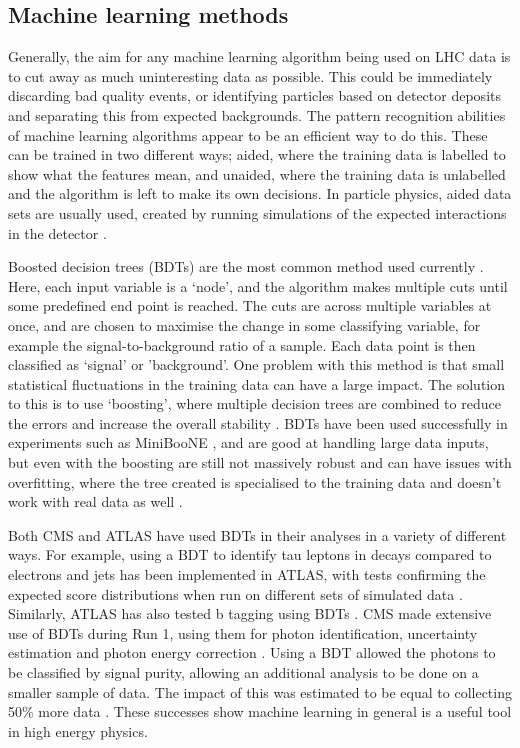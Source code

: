 \documentclass[12pt]{article}
\begin{document}
\subsection*{Machine learning methods}

Generally, the aim for any machine learning algorithm being used on LHC data is to cut away as much uninteresting data as possible. This could be immediately discarding bad quality events, or identifying particles based on detector deposits and separating this from expected backgrounds. The pattern recognition abilities of machine learning algorithms appear to be an efficient way to do this. These can be trained in two different ways; aided, where the training data is labelled to show what the features mean, and unaided, where the training data is unlabelled and the algorithm is left to make its own decisions. In particle physics, aided data sets are usually used, created by running simulations of the expected interactions in the detector \cite{mlreview}. 

Boosted decision trees (BDTs) are the most common method used currently \cite{ml7}. Here, each input variable is a `node', and the algorithm makes multiple cuts until some predefined end point is reached. The cuts are across multiple variables at once, and are chosen to maximise the change in some classifying variable, for example the signal-to-background ratio of a sample. Each data point is then classified as `signal' or 'background'. One problem with this method is that small statistical fluctuations in the training data can have a large impact. The solution to this is to use `boosting', where multiple decision trees are combined to reduce the errors and increase the overall stability \cite{ml8}. BDTs have been used successfully in experiments such as MiniBooNE \cite{ml2}, and are good at handling large data inputs, but even with the boosting are still not massively robust and can have issues with overfitting, where the tree created is specialised to the training data and doesn't work with real data as well \cite{ml1}. 

Both CMS and ATLAS have used BDTs in their analyses in a variety of different ways. For example, using a BDT to identify tau leptons in decays compared to electrons and jets has been implemented in ATLAS, with tests confirming the expected score distributions when run on different sets of simulated data \cite{ml4}. Similarly, ATLAS has also tested b tagging using BDTs \cite{ml5}. CMS made extensive use of BDTs during Run 1, using them for photon identification, uncertainty estimation and photon energy correction \cite{ml6}. Using a BDT allowed the photons to be classified by signal purity, allowing an additional analysis to be done on a smaller sample of data. The impact of this was estimated to be equal to collecting 50$\%$ more data \cite{mlreview}. These successes show machine learning in general is a useful tool in high energy physics.
\end{document}
